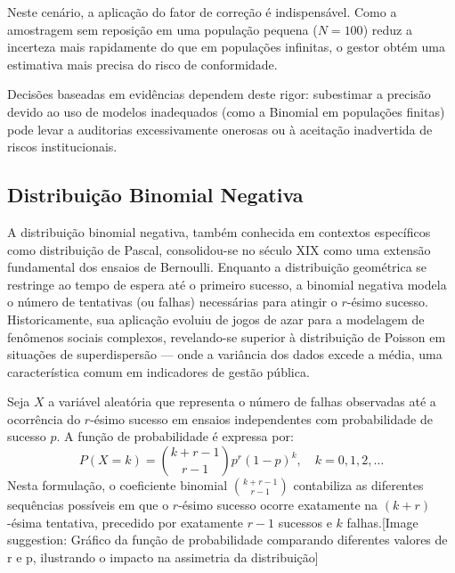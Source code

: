 Neste cenário, a aplicação do fator de correção é indispensável. Como a amostragem sem reposição em uma população pequena ($N=100$) reduz a incerteza mais rapidamente do que em populações infinitas, o gestor obtém uma estimativa mais precisa do risco de conformidade. 

Decisões baseadas em evidências dependem deste rigor: subestimar a precisão devido ao uso de modelos inadequados (como a Binomial em populações finitas) pode levar a auditorias excessivamente onerosas ou à aceitação inadvertida de riscos institucionais.







\subsection{Distribuição Binomial Negativa}

A distribuição binomial negativa, também conhecida em contextos específicos como distribuição de Pascal, consolidou-se no século XIX como uma extensão fundamental dos ensaios de Bernoulli. Enquanto a distribuição geométrica se restringe ao tempo de espera até o primeiro sucesso, a binomial negativa modela o número de tentativas (ou falhas) necessárias para atingir o $r$-ésimo sucesso. Historicamente, sua aplicação evoluiu de jogos de azar para a modelagem de fenômenos sociais complexos, revelando-se superior à distribuição de Poisson em situações de superdispersão — onde a variância dos dados excede a média, uma característica comum em indicadores de gestão pública.


Seja $X$ a variável aleatória que representa o número de falhas observadas até a ocorrência do $r$-ésimo sucesso em ensaios independentes com probabilidade de sucesso $p$. A função de probabilidade é expressa por:$$P(X=k)=\binom{k+r-1}{r-1}p^r(1-p)^k, \quad k=0, 1, 2, \dots$$Nesta formulação, o coeficiente binomial $\binom{k+r-1}{r-1}$ contabiliza as diferentes sequências possíveis em que o $r$-ésimo sucesso ocorre exatamente na $(k+r)$-ésima tentativa, precedido por exatamente $r-1$ sucessos e $k$ falhas.[Image suggestion: Gráfico da função de probabilidade comparando diferentes valores de r e p, ilustrando o impacto na assimetria da distribuição]

